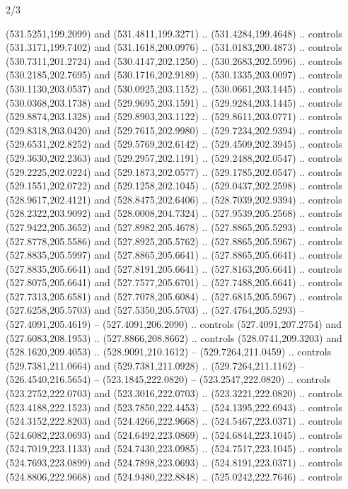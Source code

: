 \begin{flagdescription}{2/3}
\begin{scope}[xshift=0.5\flaglength,yshift=0.5\flagwidth,scale=\flagwidth/495.65]
\begin{scope}[y=0.8pt, x=0.8pt, yscale=-1,shift={(-463.76,-309.78)}]
  (531.5251,199.2099) and (531.4811,199.3271) .. (531.4284,199.4648) .. controls
  (531.3171,199.7402) and (531.1618,200.0976) .. (531.0183,200.4873) .. controls
  (530.7311,201.2724) and (530.4147,202.1250) .. (530.2683,202.5996) .. controls
  (530.2185,202.7695) and (530.1716,202.9189) .. (530.1335,203.0097) .. controls
  (530.1130,203.0537) and (530.0925,203.1152) .. (530.0661,203.1445) .. controls
  (530.0368,203.1738) and (529.9695,203.1591) .. (529.9284,203.1445) .. controls
  (529.8874,203.1328) and (529.8903,203.1122) .. (529.8611,203.0771) .. controls
  (529.8318,203.0420) and (529.7615,202.9980) .. (529.7234,202.9394) .. controls
  (529.6531,202.8252) and (529.5769,202.6142) .. (529.4509,202.3945) .. controls
  (529.3630,202.2363) and (529.2957,202.1191) .. (529.2488,202.0547) .. controls
  (529.2225,202.0224) and (529.1873,202.0577) .. (529.1785,202.0547) .. controls
  (529.1551,202.0722) and (529.1258,202.1045) .. (529.0437,202.2598) .. controls
  (528.9617,202.4121) and (528.8475,202.6406) .. (528.7039,202.9394) .. controls
  (528.2322,203.9092) and (528.0008,204.7324) .. (527.9539,205.2568) .. controls
  (527.9422,205.3652) and (527.8982,205.4678) .. (527.8865,205.5293) .. controls
  (527.8778,205.5586) and (527.8925,205.5762) .. (527.8865,205.5967) .. controls
  (527.8835,205.5997) and (527.8865,205.6641) .. (527.8865,205.6641) .. controls
  (527.8835,205.6641) and (527.8191,205.6641) .. (527.8163,205.6641) .. controls
  (527.8075,205.6641) and (527.7577,205.6701) .. (527.7488,205.6641) .. controls
  (527.7313,205.6581) and (527.7078,205.6084) .. (527.6815,205.5967) .. controls
  (527.6258,205.5703) and (527.5350,205.5703) .. (527.4764,205.5293) --
  (527.4091,205.4619) -- (527.4091,206.2090) .. controls (527.4091,207.2754) and
  (527.6083,208.1953) .. (527.8866,208.8662) .. controls (528.0741,209.3203) and
  (528.1620,209.4053) .. (528.9091,210.1612) -- (529.7264,211.0459) .. controls
  (529.7381,211.0664) and (529.7381,211.0928) .. (529.7264,211.1162) --
  (526.4540,216.5654) -- (523.1845,222.0820) -- (523.2547,222.0820) .. controls
  (523.2752,222.0703) and (523.3016,222.0703) .. (523.3221,222.0820) .. controls
  (523.4188,222.1523) and (523.7850,222.4453) .. (524.1395,222.6943) .. controls
  (524.3152,222.8203) and (524.4266,222.9668) .. (524.5467,223.0371) .. controls
  (524.6082,223.0693) and (524.6492,223.0869) .. (524.6844,223.1045) .. controls
  (524.7019,223.1133) and (524.7430,223.0985) .. (524.7517,223.1045) .. controls
  (524.7693,223.0899) and (524.7898,223.0693) .. (524.8191,223.0371) .. controls
  (524.8806,222.9668) and (524.9480,222.8848) .. (525.0242,222.7646) .. controls

\end{scope}
\end{scope}
\end{flagdescription}

